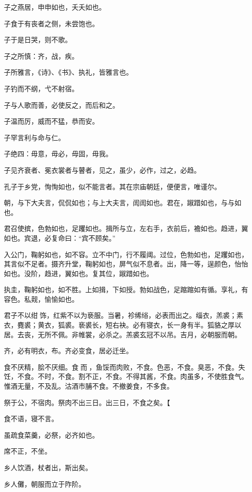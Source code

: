 \documentclass[a5paper]{ctexbook}
\begin{document}
    子之燕居，申申如也，夭夭如也。

    子食于有丧者之侧，未尝饱也。

    子于是日哭，则不歌。

    子之所慎：齐，战，疾。

    子所雅言，《诗》、《书》、执礼，皆雅言也。

    子钓而不纲，弋不射宿。

    子与人歌而善，必使反之，而后和之。

    子温而厉，威而不猛，恭而安。

    子罕言利与命与仁。

    子绝四：毋意，毋必，毋固，毋我。

    子见齐衰者、冕衣裳者与瞽者，见之，虽少，必作，过之，必趋。

    孔子于乡党，恂恂如也，似不能言者。其在宗庙朝廷，便便言，唯谨尔。

    朝，与下大夫言，侃侃如也；与上大夫言，訚訚如也。君在，踧踖如也，与与如也。

    君召使摈，色勃如也，足躩如也。揖所与立，左右手，衣前后，襜如也。趋进，翼如也。宾退，必复命曰：“宾不顾矣。”

    入公门，鞠躬如也，如不容。立不中门，行不履阈。过位，色勃如也，足躩如也，其言似不足者。摄齐升堂，鞠躬如也，屏气似不息者。出，降一等，逞颜色，怡怡如也。没阶，趋进，翼如也。复其位，踧踖如也。

    执圭，鞠躬如也，如不胜。上如揖，下如授。勃如战色，足蹜蹜如有循。享礼，有容色。私觌，愉愉如也。

    君子不以绀𮉪饰，红紫不以为亵服。当暑，袗𫄨绤，必表而出之。缁衣，羔裘；素衣，麑裘；黄衣，狐裘。亵裘长，短右袂。必有寝衣，长一身有半。狐貉之厚以居。去丧，无所不佩。非帷裳，必杀之。羔裘玄冠不以吊。吉月，必朝服而朝。

    齐，必有明衣，布。齐必变食，居必迁坐。

    食不厌精，脍不厌细。食𮩞而𮩝，鱼馁而肉败，不食。色恶，不食。臭恶，不食。失饪，不食。不时，不食。割不正，不食。不得其酱，不食。肉虽多，不使胜食气。惟酒无量，不及乱。沽酒市脯不食。不撤姜食，不多食。

    祭于公，不宿肉。祭肉不出三日。出三日，不食之矣。【
    
    食不语，寝不言。
    
    虽疏食菜羹，必祭，必齐如也。

    席不正，不坐。
    
    乡人饮酒，杖者出，斯出矣。
    
    乡人儺，朝服而立于阼阶。
    
\end{document}
